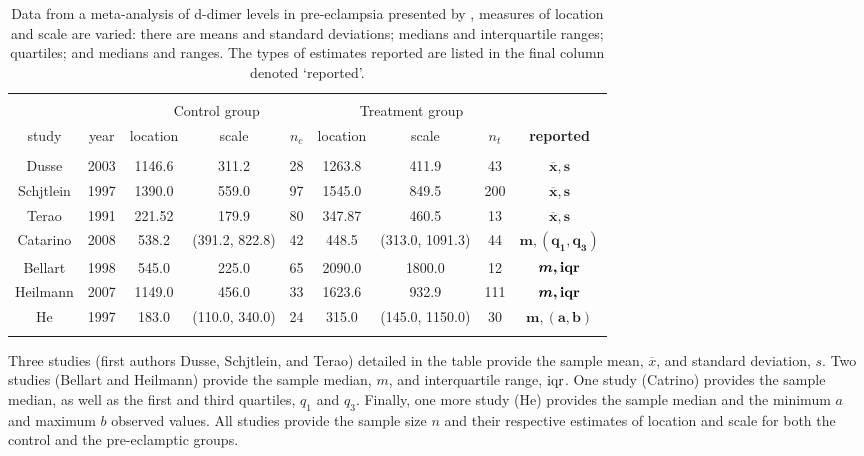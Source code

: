 \documentclass{article}
\begin{document}
\begin{table}[!htbp] \centering
  \small
\begin{tabular}{@{\extracolsep{5pt}} ccccccccc}
\\[-1.8ex]\hline
\hline \\[-1.8ex]
& & \multicolumn{3}{c}{Control group} & \multicolumn{3}{c}{Treatment group} & \\ \cline{3-5} \cline{6-8}
study & year & location & scale & $n_c$ & location & scale & $n_t$ &
\bf{reported} \\
\hline \\[-1.8ex]
Dusse &2003 & 1146.6 & 311.2 & 28 & 1263.8 & 411.9 & 43 & $\bm{\overline x, s}$  \\
Schjtlein &1997 & 1390.0 & 559.0 & 97 & 1545.0 & 849.5 & 200 & $\bm{\overline x, s}$  \\
Terao &1991 & 221.52 & 179.9 & 80 & 347.87 & 460.5 & 13 & $\bm{\overline x, s}$  \\
Catarino &2008 & 538.2 & (391.2, 822.8) & 42 & 448.5  & (313.0, 1091.3) & 44 & $\bm{m, (q_1, q_3)}$ \\
Bellart &1998 & 545.0 & 225.0 & 65 & 2090.0 & 1800.0 & 12 & $\bm{m, \iqr}$ \\
Heilmann &2007 & 1149.0 & 456.0 & 33 & 1623.6 & 932.9 & 111 & $\bm{m, \iqr}$ \\
He & 1997 & 183.0 & (110.0, 340.0) & 24 & 315.0 & (145.0, 1150.0) & 30 & $\bm{m, (a, b)}$\\
\hline \\[-1.8ex]
\end{tabular}
\caption{Data from a meta-analysis of d-dimer levels in pre-eclampsia presented by \cite{pinheiroDdimerPreeclampsiaSystematic2012}, measures of location and scale are varied: there are means and standard deviations; medians and interquartile ranges; quartiles; and medians and ranges. The types of estimates reported are listed in the final column denoted `reported'.}
  \label{tab: pinheiro}
\end{table}

Three studies (first authors Dusse, Schjtlein, and Terao) detailed in the table provide the sample mean, $\overline x$, and standard deviation, $s$. Two studies (Bellart and Heilmann) provide the sample median, $m$, and interquartile range, $\operatorname{iqr}$. One study (Catrino) provides the sample median, as well as the first and third quartiles, $q_1$ and $q_3$. Finally, one more study (He) provides the sample median and the minimum $a$ and maximum $b$ observed values. All studies provide the sample size $n$ and their respective estimates of location and scale for both the control and the pre-eclamptic groups.
\end{document}
